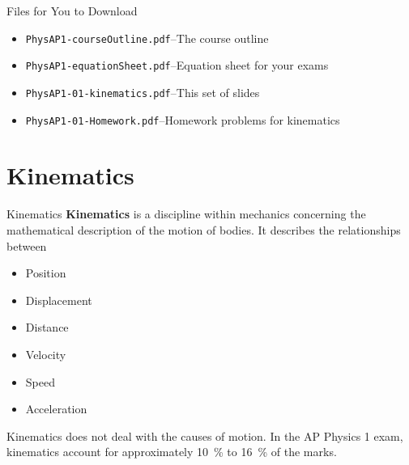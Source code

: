 \documentclass[12pt,compress,aspectratio=169]{beamer}
\begin{document}
\begin{frame}
  \titlepage
\end{frame}



\begin{frame}{Files for You to Download}
  \begin{itemize}
  \item\texttt{PhysAP1-courseOutline.pdf}--The course outline
  \item\texttt{PhysAP1-equationSheet.pdf}--Equation sheet for your exams
  \item\texttt{PhysAP1-01-kinematics.pdf}--This set of slides
  \item\texttt{PhysAP1-01-Homework.pdf}--Homework problems for kinematics
  \end{itemize}

\end{frame}






\section{Kinematics}

\begin{frame}{Kinematics}
  \textbf{Kinematics} is a discipline within mechanics concerning the
  mathematical description of the motion of bodies. It describes the
  relationships between 
  \begin{itemize}
  \item<alert@1> Position
  \item<alert@1> Displacement
  \item Distance 
  \item<alert@1> Velocity
  \item Speed
  \item<alert@1> Acceleration
  \end{itemize}
  Kinematics does not deal with the causes of motion. In the AP Physics 1 exam,
  kinematics account for approximately \SI{10}{\percent} to \SI{16}{\percent} of
  the marks.
\end{frame}
\end{document}
